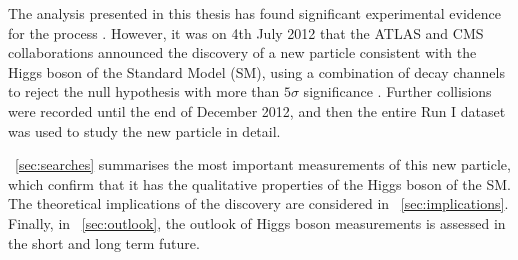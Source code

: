 
The analysis presented in this thesis has found significant experimental evidence for the 
process \ggHWWlvlv. However, it was on 4th July 2012 that the ATLAS and CMS collaborations 
announced the discovery of a new particle consistent with the Higgs boson of the Standard 
Model (SM), using a combination of decay channels to reject the null hypothesis with more 
than $5\sigma$ significance \cite{ATLAS-discovery,CMS-discovery}. Further \pp collisions 
were recorded until the end of December 2012, and then the entire Run I dataset was used 
to study the new particle in detail.

\Section~\ref{sec:searches} summarises the most important measurements of this new particle, 
which confirm that it has the qualitative properties of the Higgs boson of the SM. The 
theoretical implications of the discovery are considered in \Section~\ref{sec:implications}. 
Finally, in \Section~\ref{sec:outlook}, the outlook of Higgs boson measurements is assessed 
in the short and long term future.
